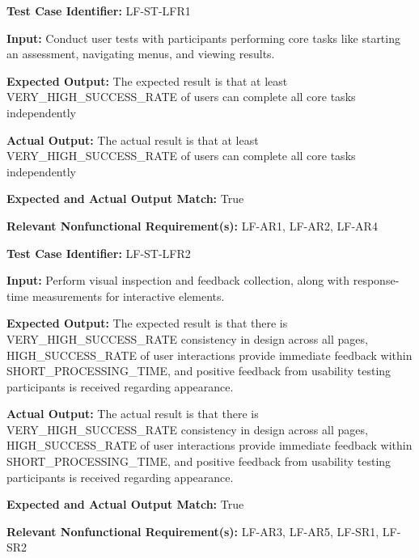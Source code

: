 \documentclass[12pt, titlepage]{article}
\begin{document}
\begin{mdframed}[linewidth=0.5mm] \par
  \textbf{Test Case Identifier:} LF-ST-LFR1 \par
  \textbf{Input:} Conduct user tests with participants performing core tasks like starting an assessment, navigating menus, and viewing results. \par
  \textbf{Expected Output:} The expected result is that at least \\VERY\_HIGH\_SUCCESS\_RATE of users can complete all core tasks independently \par
  \textbf{Actual Output:} The actual result is that at least \\VERY\_HIGH\_SUCCESS\_RATE of users can complete all core tasks independently \par
  \textbf{Expected and Actual Output Match:} True \par
  \textbf{Relevant Nonfunctional Requirement(s):} LF-AR1, LF-AR2, LF-AR4
\end{mdframed}

\begin{mdframed}[linewidth=0.5mm] \par
  \textbf{Test Case Identifier:} LF-ST-LFR2 \par
  \textbf{Input:} Perform visual inspection and feedback collection, along with response-time measurements for interactive elements. \par
  \textbf{Expected Output:} The expected result is that there is \\VERY\_HIGH\_SUCCESS\_RATE consistency in design across all pages, \\HIGH\_SUCCESS\_RATE of user interactions provide immediate feedback within SHORT\_PROCESSING\_TIME, and positive feedback from usability testing participants is received regarding appearance. \par
  \textbf{Actual Output:} The actual result is that there is \\VERY\_HIGH\_SUCCESS\_RATE consistency in design across all pages, \\HIGH\_SUCCESS\_RATE of user interactions provide immediate feedback within SHORT\_PROCESSING\_TIME, and positive feedback from usability testing participants is received regarding appearance. \par
  \textbf{Expected and Actual Output Match:} True \par
  \textbf{Relevant Nonfunctional Requirement(s):} LF-AR3, LF-AR5, LF-SR1, LF-SR2
\end{mdframed}
		
\end{document}
